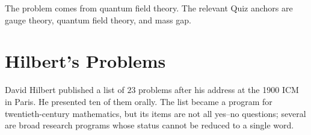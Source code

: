     \begin{remark}
        The problem comes from quantum field theory. The relevant Quiz anchors
        are gauge theory, quantum field theory, and mass gap.
    \end{remark}

    \section*{Hilbert's Problems}

    David Hilbert published a list of $23$ problems after his address at the
    1900 ICM in Paris. He presented ten of them orally. The list became a
    program for twentieth-century mathematics, but its items are not all
    yes--no questions; several are broad research programs whose status cannot
    be reduced to a single word.

    \vspace{1em}

